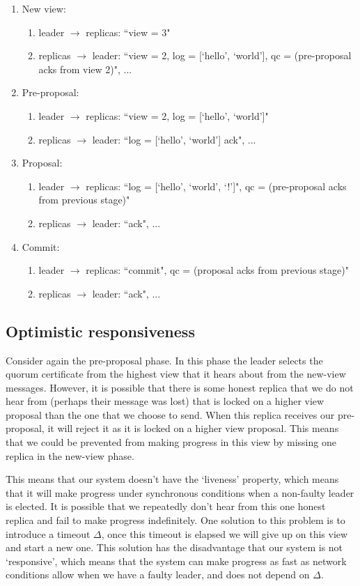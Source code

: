 \documentclass[a4paper]{article}
\begin{document}
\begin{enumerate}
\item New view: 
	\begin{enumerate}
	\item leader $\to$ replicas: ``view = 3" 
	\item replicas $\to$ leader: ``view = 2, log = [`hello', `world'], qc = (pre-proposal acks from view 2)", ...
	\end{enumerate}
\item Pre-proposal:
	\begin{enumerate}
	\item leader $\to$ replicas: ``view = 2, log = [`hello', `world']"
	\item replicas $\to$ leader: ``log = [`hello', `world'] ack", ...
	\end{enumerate}
\item Proposal:
	\begin{enumerate}
	\item leader $\to$ replicas: ``log = [`hello', `world', `!']", qc = (pre-proposal acks from previous stage)"
	\item replicas $\to$ leader: ``ack", ...
	\end{enumerate}
\item Commit:
	\begin{enumerate}
	\item leader $\to$ replicas: ``commit", qc = (proposal acks from previous stage)"
	\item replicas $\to$ leader: ``ack", ...
	\end{enumerate}
\end{enumerate}
\subsection{Optimistic responsiveness}
Consider again the pre-proposal phase. In this phase the leader selects the quorum certificate from the highest view that it hears about from the new-view messages. However, it is possible that there is some honest replica that we do not hear from (perhaps their message was lost) that is locked on a higher view proposal than the one that we choose to send. When this replica receives our pre-proposal, it will reject it as it is locked on a higher view proposal. This means that we could be prevented from making progress in this view by missing one replica in the new-view phase.

This means that our system doesn't have the `liveness' property, which means that it will make progress under synchronous conditions when a non-faulty leader is elected. It is possible that we repeatedly don't hear from this one honest replica and fail to make progress indefinitely. One solution to this problem is to introduce a timeout $\Delta$, once this timeout is elapsed we will give up on this view and start a new one. This solution has the disadvantage that our system is not `responsive', which means that the system can make progress as fast as network conditions allow when we have a faulty leader, and does not depend on $\Delta$.
\end{document}
